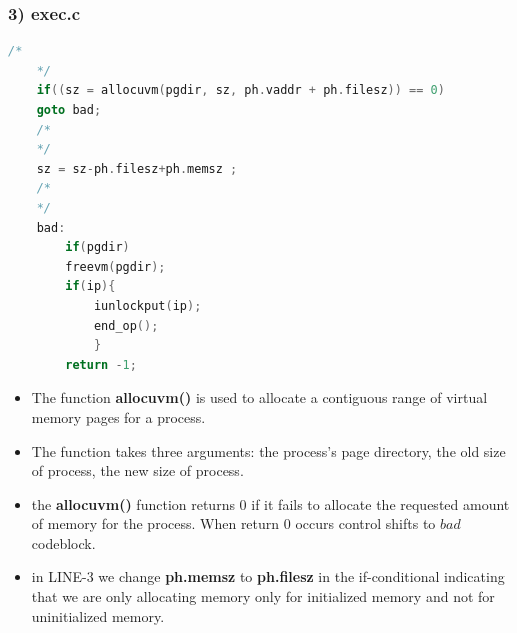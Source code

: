 \documentclass[12pt,a4paper]{article}
\begin{document}
	\subsubsection*{3) exec.c}
									\begin{lstlisting}[language=C, style = mystyle]
	/*
	*/
    if((sz = allocuvm(pgdir, sz, ph.vaddr + ph.filesz)) == 0) 
	goto bad; 
	/*
	*/
	sz = sz-ph.filesz+ph.memsz ; 
	/*
	*/
	bad:
		if(pgdir)
		freevm(pgdir);
		if(ip){
			iunlockput(ip);
			end_op();
			}
		return -1;
\end{lstlisting}
\begin{itemize}
	\item The function \textbf{allocuvm()} is used to allocate a contiguous range of virtual memory pages for a process.
	\item The function takes three arguments: the process's page directory, the old size of process, the new size of process.
	\item  the \textbf{allocuvm()} function returns 0 if it fails to allocate the requested amount of memory for the process. When return 0 occurs control shifts to $bad$ codeblock. 
	\item in LINE-3 we change \textbf{ph.memsz} to \textbf{ph.filesz} in the if-conditional indicating that we are only allocating memory only for initialized memory and not for uninitialized memory. 
\end{itemize}
\end{document}
